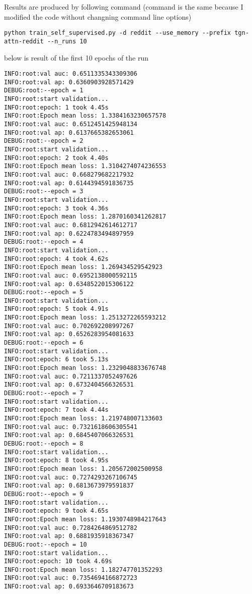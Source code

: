 \documentclass[11pt]{article}
\begin{document}
Results are produced by following command (command is the same because I modified the code without changning command line options)
\begin{verbatim}
python train_self_supervised.py -d reddit --use_memory --prefix tgn-attn-reddit --n_runs 10
\end{verbatim}

below is result of the first 10 epochs of the run
\begin{verbatim}
INFO:root:val auc: 0.6511335343309306
INFO:root:val ap: 0.6360903928571429
DEBUG:root:--epoch = 1
INFO:root:start validation...
INFO:root:epoch: 1 took 4.45s
INFO:root:Epoch mean loss: 1.3384163230657578
INFO:root:val auc: 0.6512451425948134
INFO:root:val ap: 0.6137665382653061
DEBUG:root:--epoch = 2
INFO:root:start validation...
INFO:root:epoch: 2 took 4.40s
INFO:root:Epoch mean loss: 1.3104274074236553
INFO:root:val auc: 0.668279682217932
INFO:root:val ap: 0.6144394591836735
DEBUG:root:--epoch = 3
INFO:root:start validation...
INFO:root:epoch: 3 took 4.36s
INFO:root:Epoch mean loss: 1.2870160341262817
INFO:root:val auc: 0.6812942614612717
INFO:root:val ap: 0.6224783494897959
DEBUG:root:--epoch = 4
INFO:root:start validation...
INFO:root:epoch: 4 took 4.62s
INFO:root:Epoch mean loss: 1.269434529542923
INFO:root:val auc: 0.6952138000592115
INFO:root:val ap: 0.6348522015306122
DEBUG:root:--epoch = 5
INFO:root:start validation...
INFO:root:epoch: 5 took 4.91s
INFO:root:Epoch mean loss: 1.2513272265593212
INFO:root:val auc: 0.702692208997267
INFO:root:val ap: 0.6526283954081633
DEBUG:root:--epoch = 6
INFO:root:start validation...
INFO:root:epoch: 6 took 5.13s
INFO:root:Epoch mean loss: 1.2329048833676748
INFO:root:val auc: 0.7211337052497626
INFO:root:val ap: 0.6732404566326531
DEBUG:root:--epoch = 7
INFO:root:start validation...
INFO:root:epoch: 7 took 4.44s
INFO:root:Epoch mean loss: 1.219748007133603
INFO:root:val auc: 0.7321618606305541
INFO:root:val ap: 0.6845407066326531
DEBUG:root:--epoch = 8
INFO:root:start validation...
INFO:root:epoch: 8 took 4.95s
INFO:root:Epoch mean loss: 1.205672002500958
INFO:root:val auc: 0.7274293267106745
INFO:root:val ap: 0.6813673979591837
DEBUG:root:--epoch = 9
INFO:root:start validation...
INFO:root:epoch: 9 took 4.65s
INFO:root:Epoch mean loss: 1.1930748984217643
INFO:root:val auc: 0.7284264869512782
INFO:root:val ap: 0.6881935918367347
DEBUG:root:--epoch = 10
INFO:root:start validation...
INFO:root:epoch: 10 took 4.69s
INFO:root:Epoch mean loss: 1.182747701352293
INFO:root:val auc: 0.7354694166872723
INFO:root:val ap: 0.6933646709183673
\end{verbatim}
\end{document}
